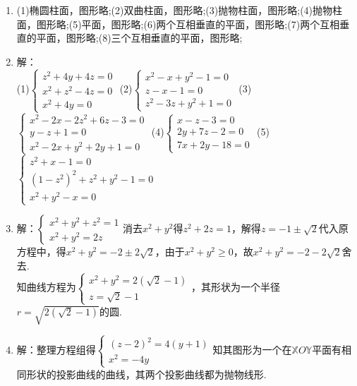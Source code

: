 \documentclass[UTF8]{ctexart}
\begin{document}
\begin{enumerate}
\item (1)椭圆柱面，图形略;(2)双曲柱面，图形略;(3)抛物柱面，图形略;(4)抛物柱面，图形略;(5)平面，图形略;(6)两个互相垂直的平面，图形略;(7)两个互相垂直的平面，图形略;(8)三个互相垂直的平面，图形略;

\item 解：\\
(1)$\left\{\begin{array}{l}z^2+4y+4z=0\\x^2+z^2-4z=0\\x^2+4y=0\end{array}\right.$
(2)$\left\{\begin{array}{l}x^2-x+y^2-1=0\\z-x-1=0\\z^2-3z+y^2+1=0\end{array}\right.$
(3)$\left\{\begin{array}{l}x^2-2x-2z^2+6z-3=0\\y-z+1=0\\x^2-2x+y^2+2y+1=0\end{array}\right.$
(4)$\left\{\begin{array}{l}x-z-3=0\\2y+7z-2=0\\7x+2y-18=0\end{array}\right.$
(5)$\left\{\begin{array}{l}z^2+x-1=0\\\left(1-z^2\right)^2+z^2+y^2-1=0\\x^2+y^2-x=0\end{array}\right.$

\item 解：$\left\{\begin{array}{l}x^2+y^2+z^2=1\\x^2+y^2=2z\end{array}\right.$消去$x^2+y^2$得$z^2+2z=1$，解得$z=-1\pm\sqrt{2}$代入原方程中，得$x^2+y^2=-2\pm2\sqrt{2}$，由于$x^2+y^2\geq0$，故$x^2+y^2=-2-2\sqrt{2}$舍去. \\
知曲线方程为$\left\{\begin{array}{l}x^2+y^2=2\left(\sqrt{2}-1\right)\\z=\sqrt{2}-1\end{array}\right.$，其形状为一个半径$r=\sqrt{2\left(\sqrt{2}-1\right)}$的圆.

\item 解：整理方程组得$\left\{\begin{array}{l}\left(z-2\right)^2=4\left(y+1\right)\\x^2=-4y\end{array}\right.$知其图形为一个在$\mathbb{X}O\mathbb{Y}$平面有相同形状的投影曲线的曲线，其两个投影曲线都为抛物线形.\\


\end{enumerate}
\end{document}
